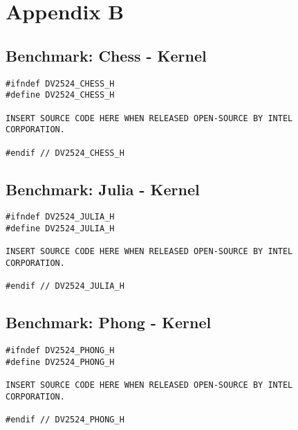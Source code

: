 
\chapter*{Appendix B}
\label{cha:appendixb}


\section*{Benchmark: Chess - Kernel}
\label{sec:appendixb_benchmarkchesskernel}
\begin{lstlisting}
#ifndef DV2524_CHESS_H
#define DV2524_CHESS_H

INSERT SOURCE CODE HERE WHEN RELEASED OPEN-SOURCE BY INTEL CORPORATION.

#endif // DV2524_CHESS_H
\end{lstlisting}

\section*{Benchmark: Julia - Kernel}
\label{sec:appendixb_benchmarkjuliakernel}
\begin{lstlisting}
#ifndef DV2524_JULIA_H
#define DV2524_JULIA_H

INSERT SOURCE CODE HERE WHEN RELEASED OPEN-SOURCE BY INTEL CORPORATION.

#endif // DV2524_JULIA_H
\end{lstlisting}

\section*{Benchmark: Phong - Kernel}
\label{sec:appendixb_benchmarkphongkernel}
\begin{lstlisting}
#ifndef DV2524_PHONG_H
#define DV2524_PHONG_H

INSERT SOURCE CODE HERE WHEN RELEASED OPEN-SOURCE BY INTEL CORPORATION.

#endif // DV2524_PHONG_H
\end{lstlisting}
